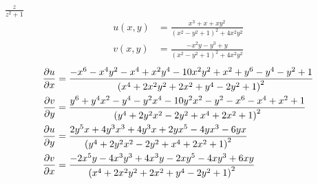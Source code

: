 \item[12.] $\frac{z}{z^2+1}$
\begin{align*}
    u(x,y) &= \frac{x^3 + x + x y^2}{(x^2 - y^2 + 1)^2 + 4x^2 y^2} \\
    v(x,y) &= \frac{-x^2 y - y^3 + y}{(x^2 - y^2 + 1)^2 + 4x^2 y^2}
\end{align*}
\begin{align*}
    \frac{\partial u}{\partial x} &= \frac{-x^6-x^4y^2-x^4+x^2y^4-10x^2y^2+x^2+y^6-y^4-y^2+1}{\left(x^4+2x^2y^2+2x^2+y^4-2y^2+1\right)^2} \\
    \frac{\partial v}{\partial y} &= \frac{y^6+y^4x^2-y^4-y^2x^4-10y^2x^2-y^2-x^6-x^4+x^2+1}{\left(y^4+2y^2x^2-2y^2+x^4+2x^2+1\right)^2} \\
    \frac{\partial u}{\partial y} &= \frac{2y^5x+4y^3x^3+4y^3x+2yx^5-4yx^3-6yx}{\left(y^4+2y^2x^2-2y^2+x^4+2x^2+1\right)^2} \\
    \frac{\partial v}{\partial x} &= \frac{-2x^5y-4x^3y^3+4x^3y-2xy^5-4xy^3+6xy}{\left(x^4+2x^2y^2+2x^2+y^4-2y^2+1\right)^2}
\end{align*}



